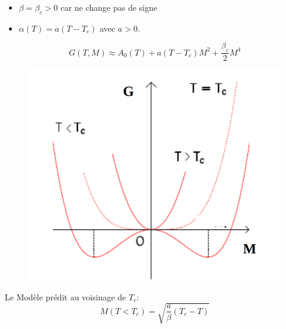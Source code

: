\documentclass[10pt]{beamer}
\begin{document}
\begin{frame}{\insertsubsection}
    \begin{itemize}
        \item $\beta = \beta_c>0$ car ne change pas de signe 
        \item $\alpha(T) = a(T-T_c)$ avec $a>0$.
    \end{itemize}
    \begin{equation}
        G(T,M)\approx A_0(T) + a(T-T_c)M^2+\dfrac{\beta_c}{2}M^4
    \end{equation}
    \begin{minipage}{.48\linewidth}
    \begin{figure}
        \centering
        \includegraphics[width=1\textwidth]{Ferro_para.png}
    \end{figure}
\end{minipage}
\begin{minipage}{.48\linewidth}
    Le Modèle prédit au voisinage de $T_c$:
    \begin{equation}
        M(T<T_c) = \sqrt{\dfrac{a}{\beta}(T_c-T)} 
    \end{equation}

\end{minipage}
\end{frame}
\end{document}
